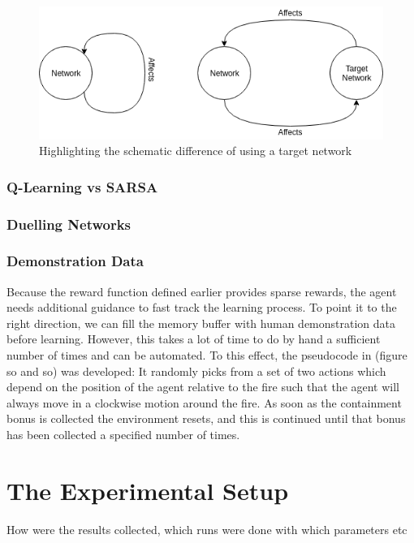 \begin{figure}[h]
    \centering
    \includegraphics[width=1\linewidth]{img/Target_Network.png}
    \caption{Highlighting the schematic difference of using a target network}
    \label{fig:targetnet}
\end{figure}


\subsubsection{Q-Learning vs SARSA}\label{sec:ql_sarsa}

\subsubsection{Duelling Networks}\label{sec:duelling}

\subsubsection{Demonstration Data}\label{sec:demo_data}
Because the reward function defined earlier provides sparse rewards, the agent needs additional guidance to fast track the learning process. To point it to the right direction, we can fill the memory buffer with human demonstration data before learning. However, this takes a lot of time to do by hand a sufficient number of times and can be automated. To this effect, the pseudocode in (figure so and so) was developed: It randomly picks from a set of two actions which depend on the position of the agent relative to the fire such that the agent will always move in a clockwise motion around the fire. As soon as the containment bonus is collected the environment resets, and this is continued until that bonus has been collected a specified number of times.

\section{The Experimental Setup}\label{sec:experiment}
How were the results collected, which runs were done with which parameters etc

